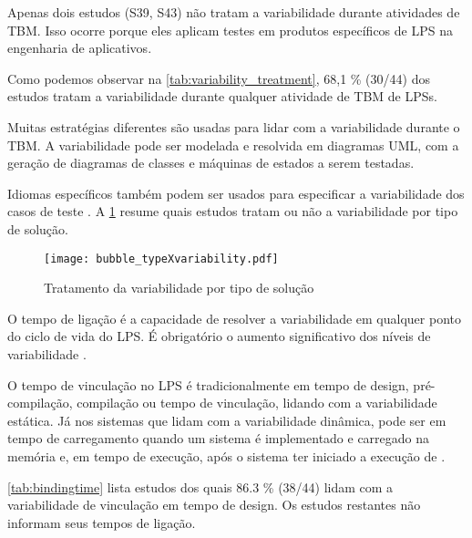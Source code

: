 Apenas dois estudos (S39, S43) não tratam a variabilidade durante atividades de TBM. Isso ocorre porque eles aplicam testes em produtos específicos de LPS na engenharia de aplicativos.

Como podemos observar na \ref{tab:variability_treatment}, 68,1 \% (30/44) dos estudos tratam a variabilidade durante qualquer atividade de TBM de LPSs. 

Muitas estratégias diferentes são usadas para lidar com a variabilidade durante o TBM. A variabilidade pode ser modelada e resolvida em diagramas UML, com a geração de diagramas de classes e máquinas de estados \cite{wang2013automated} a serem testadas. 

Idiomas específicos também podem ser usados para especificar a variabilidade dos casos de teste \cite{devroey2014behavioural}. A \ref{fig:typexvariability} resume quais estudos tratam ou não a variabilidade por tipo de solução. 

\begin{figure}[!h]
	\centering	
	\texttt{[image: bubble\_typeXvariability.pdf]}
	\caption{Tratamento da variabilidade por tipo de solução}
	\label{fig:typexvariability}
\end{figure}

O tempo de ligação é a capacidade de resolver a variabilidade em qualquer ponto do ciclo de vida do LPS. É obrigatório o aumento significativo dos níveis de variabilidade \cite{Chen_et_al2009}.

O tempo de vinculação no LPS é tradicionalmente em tempo de design, pré-compilação, compilação ou tempo de vinculação, lidando com a variabilidade estática. Já nos sistemas que lidam com a variabilidade dinâmica, pode ser em tempo de carregamento quando um sistema é implementado e carregado na memória e, em tempo de execução, após o sistema ter iniciado a execução de \cite{Alves_et_al2009}.

\ref{tab:bindingtime} lista estudos dos quais 86.3 \% (38/44) lidam com a variabilidade de vinculação em tempo de design. Os estudos restantes não informam seus tempos de ligação.

